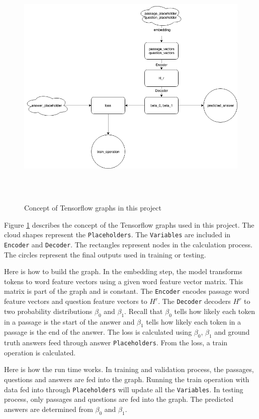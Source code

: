 \documentclass[modernstyle,12pt]{sjsuthesis}
\theoremstyle{definition}
\begin{document}
\begin{figure}[htbp]\centering
  \includegraphics[width=12cm, height=12cm]{figures/tf_graph.png}
  \caption{Concept of Tensorflow graphs in this project}
  \label{f:tf_graph}
\end{figure}

Figure \ref{f:tf_graph} describes the concept of the Tensorflow graphs used in this project. The cloud shapes represent the {\tt Placeholders}. The {\tt Variables} are included in {\tt Encoder} and {\tt Decoder}. The rectangles represent nodes in the calculation process. The circles represent the final outputs used in training or testing.

Here is how to build the graph. In the embedding step, the model transforms tokens to word feature vectors using a given word feature vector matrix. This matrix is part of the graph and is constant. The {\tt Encoder} encodes passage word feature vectors and question feature vectors to $H^r$. The {\tt Decoder} decoders $H^r$ to two probability distributions $\beta _0$ and $\beta _1$. Recall that $\beta _0$ tells how likely each token in a passage is the start of the answer and $\beta _1$ tells how likely each token in a passage is the end of the answer. The loss is calculated using $\beta _0$, $\beta _1$ and ground truth answers feed through answer {\tt Placeholders}. From the loss, a train operation is calculated.

Here is how the run time works. In training and validation process, the passages, questions and answers are fed into the graph. Running the train operation with data fed into through {\tt Placeholders} will update all the {\tt Variables}. In testing process, only passages and questions are fed into the graph. The predicted answers are determined from $\beta _0$ and $\beta _1$.
\end{document}
